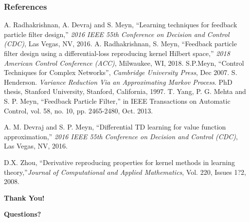 \documentclass[xcolor=dvipsnames, subsection=false]{beamer}
\begin{document}
%	
%	
%	

\begin{frame}
\frametitle{References}

\begin{thebibliography}{10}
	\tiny
	A. Radhakrishnan, A. Devraj and S. Meyn, ``Learning techniques for feedback particle filter design,'' \textit{ 2016 IEEE 55th Conference on Decision and Control (CDC)}, Las Vegas, NV, 2016.
	A. Radhakrishnan, S. Meyn, ``Feedback particle filter design using a differential-loss reproducing kernel Hilbert space,'' \textit{2018 American Control Conference (ACC)}, Milwaukee, WI, 2018.
	S.P.Meyn, ``Control Techniques for Complex Networks'', \textit{Cambridge University Press}, Dec 2007.
	S. Henderson. \textit{Variance Reduction Via an Approximating Markov Process}. PhD thesis, Stanford University, Stanford, California, 1997.
	T. Yang, P. G. Mehta and S. P. Meyn, ``Feedback Particle Filter,'' in IEEE Transactions on Automatic Control, vol. 58, no. 10, pp. 2465-2480, Oct. 2013.
	
	A. M. Devraj and S. P. Meyn, ``Differential TD learning for value function approximation,'' \textit{2016 IEEE 55th Conference on Decision and Control (CDC)}, Las Vegas, NV, 2016.
	
	D.X. Zhou,
``Derivative reproducing properties for kernel methods in learning theory,''\textit{Journal of Computational and Applied Mathematics},
 Vol. 220, Issues 1?2,
	2008.
	
\end{thebibliography}
\end{frame}



\begin{frame}
\centerline{\bf \huge \color{OrangeRed} Thank You!}
\vfill
\centerline{\huge \textbf{Questions?}}
\vfill
\end{frame}
\end{document}
